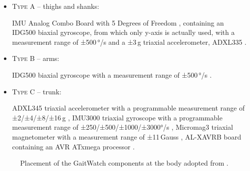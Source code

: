 \begin{itemize}

\item \textsc{Type A} -- thighs and shanks: 

IMU Analog Combo Board with 5 Degrees of Freedom \cite{IMU5}, containing an IDG500 biaxial gyroscope, from which only y-axis is actually used, with a measurement range of ±500\,°/s \cite{IDG500} and a ±3\,g triaxial accelerometer, ADXL335 \cite{ADXL335}.

\item \textsc{Type B} -- arms:

IDG500 biaxial gyroscope with a measurement range of ±500\,°/s \cite{IDG500}.

\item \textsc{Type C} -- trunk:

ADXL345 triaxial accelerometer with a programmable measurement range of ±2/±4/±8/±16\,g \cite{ADXL345},
IMU3000 triaxial gyroscope with a programmable measurement range of ±250/±500/±1000/±3000°/s \cite{IMU3000}, 
Micromag3 \allowbreak triaxial magnetometer with a measurement range of ±11\,Gauss \cite{MicroMag3}, AL-XAVRB board containing an AVR ATxmega processor \cite{AVRATxmega}.

\end{itemize}

\begin{figure}
	\centering
	\caption{Placement of the GaitWatch components at the body adopted from \cite{olivares_vicente_gaitwatch_2013}.}
	\label{fig:GaitWatch_placement}
\end{figure}
